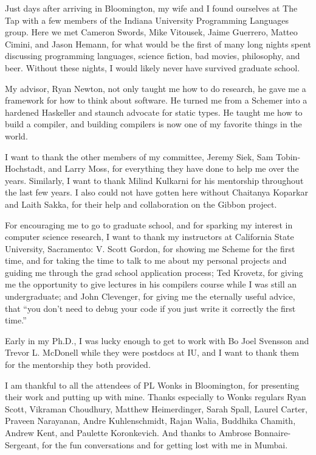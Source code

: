 
\begin{acknowledgments}

  Just days after arriving in Bloomington, my wife and I found ourselves at The
  Tap with a few members of the Indiana University Programming Languages group.
  Here we met Cameron Swords, Mike Vitousek, Jaime Guerrero, Matteo Cimini, and
  Jason Hemann, for what would be the first of many long nights spent discussing
  programming languages, science fiction, bad movies, philosophy, and beer.
  Without these nights, I would likely never have survived graduate school.

  My advisor, Ryan Newton, not only taught me how to do research, he gave me a
  framework for how to think about software. He turned me from a Schemer into a
  hardened Haskeller and staunch advocate for static types. He taught me how to
  build a compiler, and building compilers is now one of my favorite things in the
  world.

  I want to thank the other members of my committee, Jeremy Siek, Sam
  Tobin-Hochstadt, and Larry Moss, for everything they have done to help me over
  the years. Similarly, I want to thank Milind Kulkarni for his mentorship
  throughout the last few years.
  I also could not have gotten here without Chaitanya
  Koparkar and Laith Sakka, for their help and collaboration on the Gibbon project.

  For encouraging me to go to graduate school, and for sparking my interest in
  computer science research, I want to thank my instructors at California State
  University, Sacramento: V. Scott Gordon, for showing me Scheme for the first
  time, and for taking the time to talk to me about my personal projects and guiding
  me through the grad school application process; Ted Krovetz, for giving me the
  opportunity to give lectures in his compilers course while I was still an
  undergraduate; and John Clevenger, for giving me the eternally useful advice,
  that ``you don't need to debug your code if you just write it correctly the first time.''

  Early in my Ph.D., I was lucky enough to get to work with Bo Joel Svensson and
  Trevor L. McDonell while they were postdocs at IU, and I want to thank them for
  the mentorship they both provided.

  I am thankful to all the attendees of PL Wonks in Bloomington, for presenting
  their work and putting up with mine. Thanks especially to Wonks regulars Ryan
  Scott, Vikraman Choudhury, Matthew Heimerdinger, Sarah Spall, Laurel Carter,
  Praveen Narayanan, Andre Kuhlenschmidt, Rajan Walia, Buddhika Chamith, Andrew
  Kent, and Paulette Koronkevich. And thanks to Ambrose Bonnaire-Sergeant, for the
  fun conversations and for getting lost with me in Mumbai.


\end{acknowledgments}
